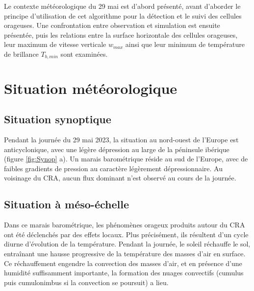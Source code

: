 \documentclass[12pt]{article}
\begin{document}
\begin{multicols}{2}
Le contexte météorologique du 29 mai est d'abord présenté, avant d'aborder le principe d'utilisation de cet algorithme pour la détection et le suivi des cellules orageuses. Une confrontation entre observation et simulation est ensuite présentée, puis les relations entre la surface horizontale des cellules orageuses, leur maximum de vitesse verticale $w_{max}$ ainsi que leur minimum de température de brillance $T_{b, min}$ sont examinées. 

\vspace{-5mm}

\section{Situation météorologique}

\subsection{Situation synoptique}

Pendant la journée du 29 mai 2023, la situation au nord-ouest de l'Europe est anticyclonique, avec une légère dépression au large de la péninsule ibérique (figure \ref{fig:Synop} a). Un marais barométrique réside au sud de l’Europe, avec de faibles gradients de pression au caractère légèrement dépressionnaire. Au voisinage du CRA, aucun flux dominant n’est observé au cours de la journée.

\subsection{Situation à méso-échelle}

Dans ce marais barométrique, les phénomènes orageux produits autour du CRA ont été déclenchés par des effets locaux. Plus précisément, ils résultent d'un cycle diurne d'évolution de la température. Pendant la journée, le soleil réchauffe le sol, entraînant une hausse progressive de la température des masses d'air en surface. Ce réchauffement engendre la convection des masses d'air, et en présence d'une humidité suffisamment importante, la formation des nuages convectifs (cumulus puis cumulonimbus si la convection se poursuit) a lieu.


\end{multicols}
\end{document}
